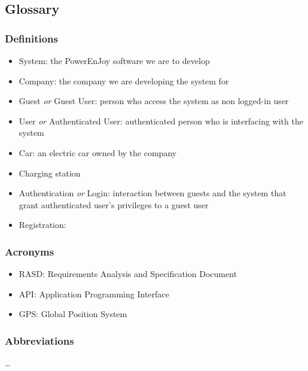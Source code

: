 \subsection{Glossary}
	\subsubsection{Definitions}
	\begin{itemize}
		\item System: the PowerEnJoy software we are to develop
		\item Company: the company we are developing the system for
		\item Guest \emph{or} Guest User: person who access the system as non logged-in user
		\item User \emph{or} Authenticated User: authenticated person who is interfacing with the system
		\item Car: an electric car owned by the company
		\item Charging station
		\item Authentication \emph{or} Login: interaction between guests and the system that grant authenticated user's privileges to a guest user
		\item Registration:
	\end{itemize}
\subsubsection{Acronyms}
	\begin{itemize}
		\item RASD: Requirements Analysis and Specification Document
		\item API: Application Programming Interface
		\item GPS: Global Position System
	\end{itemize}
\subsubsection{Abbreviations}
 \ldots
